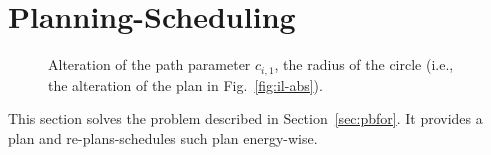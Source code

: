 \documentclass[letterpaper,10pt,journal,twoside]{IEEEtran}
\newcommand{\figpath}{./figures}
\theoremstyle{definition}
\begin{document}




\vspace*{-1.4ex}
\section{Planning-Scheduling}  %
\label{sec:algo}               %
\begin{figure}[t]
  \footnotesize
  \begin{minipage}[l]{0.25\columnwidth}
    \caption{Alteration of the path parameter $c_{i,1}$, the radius of the circle (i.e., the alteration of the plan in Fig.~\ref{fig:il-abs}).
    }
    \label{fig:tee1}
  \end{minipage}\hfill
  \begin{minipage}[c]{0.7\columnwidth}
    \centering
    \vspace*{-4.5ex}
    
  \end{minipage}
  \vspace*{-4.5ex}
\end{figure}

This section solves the problem described in Section~\ref{sec:pbfor}. It provides a plan %
and re-plans-schedules such plan energy-wise. %
\end{document}
